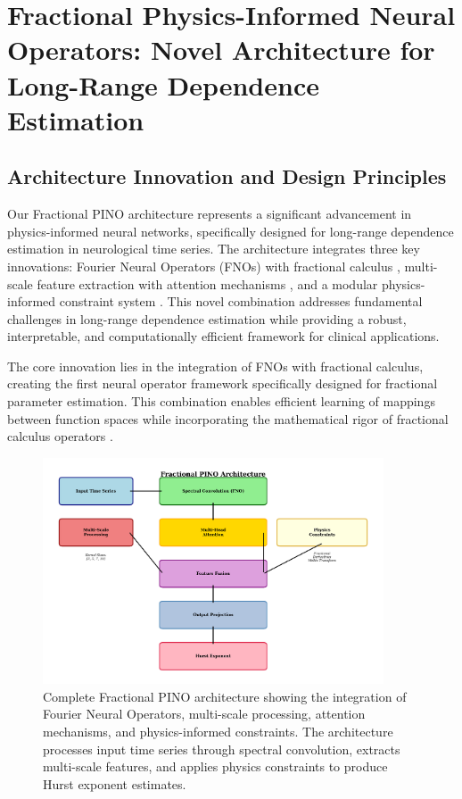 \section{Fractional Physics-Informed Neural Operators: Novel Architecture for Long-Range Dependence Estimation}

\subsection{Architecture Innovation and Design Principles}

Our Fractional PINO architecture represents a significant advancement in physics-informed neural networks, specifically designed for long-range dependence estimation in neurological time series. The architecture integrates three key innovations: Fourier Neural Operators (FNOs) with fractional calculus \cite{li2020fourier}, multi-scale feature extraction with attention mechanisms \cite{vaswani2017attention}, and a modular physics-informed constraint system \cite{raissi2019physics}. This novel combination addresses fundamental challenges in long-range dependence estimation while providing a robust, interpretable, and computationally efficient framework for clinical applications.

The core innovation lies in the integration of FNOs with fractional calculus, creating the first neural operator framework specifically designed for fractional parameter estimation. This combination enables efficient learning of mappings between function spaces while incorporating the mathematical rigor of fractional calculus operators \cite{kilbas2006theory, oldham1974fractional}.

\begin{figure}[h]
\centering
\includegraphics[width=0.9\textwidth]{fractional_pino_architecture.png}
\caption{Complete Fractional PINO architecture showing the integration of Fourier Neural Operators, multi-scale processing, attention mechanisms, and physics-informed constraints. The architecture processes input time series through spectral convolution, extracts multi-scale features, and applies physics constraints to produce Hurst exponent estimates.}
\label{fig:fractional_pino_architecture}
\end{figure}

